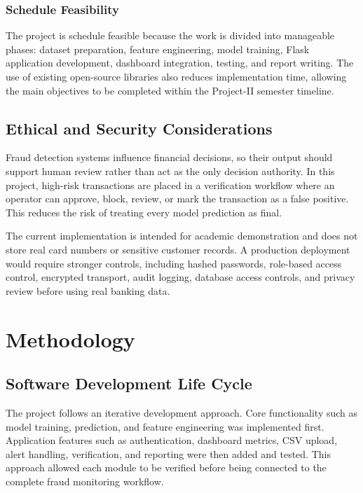 \documentclass[12pt,a4paper]{report}
\begin{document}
\subsection{Schedule Feasibility}
The project is schedule feasible because the work is divided into manageable phases: dataset preparation, feature engineering, model training, Flask application development, dashboard integration, testing, and report writing. The use of existing open-source libraries also reduces implementation time, allowing the main objectives to be completed within the Project-II semester timeline.

\section{Ethical and Security Considerations}
Fraud detection systems influence financial decisions, so their output should support human review rather than act as the only decision authority. In this project, high-risk transactions are placed in a verification workflow where an operator can approve, block, review, or mark the transaction as a false positive. This reduces the risk of treating every model prediction as final.

The current implementation is intended for academic demonstration and does not store real card numbers or sensitive customer records. A production deployment would require stronger controls, including hashed passwords, role-based access control, encrypted transport, audit logging, database access controls, and privacy review before using real banking data.

\chapter{Methodology}

\section{Software Development Life Cycle}
The project follows an iterative development approach. Core functionality such as model training, prediction, and feature engineering was implemented first. Application features such as authentication, dashboard metrics, CSV upload, alert handling, verification, and reporting were then added and tested. This approach allowed each module to be verified before being connected to the complete fraud monitoring workflow.
\end{document}
